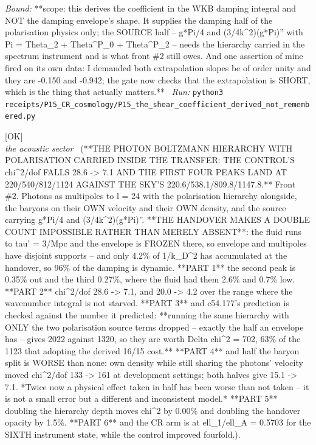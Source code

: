 \begin{description}
 \emph{Bound:} **scope: this derives the coefficient in the WKB damping integral and NOT the damping envelope's shape. It supplies the damping half of the polarisation physics only; the SOURCE half -- g*Pi/4 and (3/4k\textasciicircum{}2)(g*Pi)'' with Pi = Theta\_2 + Theta\textasciicircum{}P\_0 + Theta\textasciicircum{}P\_2 -- needs the hierarchy carried in the spectrum instrument and is what front \#2 still owes. And one assertion of mine fired on its own data: I demanded both extrapolation slopes be of order unity and they are -0.150 and -0.942; the gate now checks that the extrapolation is SHORT, which is the thing that actually matters.**
\ \emph{Run:} \texttt{python3 receipts/P15\_CR\_cosmology/P15\_the\_shear\_coefficient\_derived\_not\_remembered.py}
\item[\label{rcpt:P15_the_photon_hierarchy_in_the_transfer}\texttt{P15\_the\_photon\_hierarchy\_in\_the\_transfer}]\hfill\textsf{[OK]}\\
\textit{the acoustic sector} \ (**THE PHOTON BOLTZMANN HIERARCHY WITH POLARISATION CARRIED INSIDE THE TRANSFER: THE CONTROL'S chi\textasciicircum{}2/dof FALLS 28.6 -> 7.1 AND THE FIRST FOUR PEAKS LAND AT 220/540/812/1124 AGAINST THE SKY'S 220.6/538.1/809.8/1147.8.** Front \#2. Photons as multipoles to l = 24 with the polarisation hierarchy alongside, the baryons on their OWN velocity and their OWN density, and the source carrying g*Pi/4 and (3/4k\textasciicircum{}2)(g*Pi)''. **THE HANDOVER MAKES A DOUBLE COUNT IMPOSSIBLE RATHER THAN MERELY ABSENT**: the fluid runs to tau' = 3/Mpc and the envelope is FROZEN there, so envelope and multipoles have disjoint supports -- and only 4.2\% of 1/k\_D\textasciicircum{}2 has accumulated at the handover, so 96\% of the damping is dynamic. **PART 1** the second peak is 0.35\% out and the third 0.27\%, where the fluid had them 2.6\% and 0.7\% low. **PART 2** chi\textasciicircum{}2/dof 28.6 -> 7.1, and 20.0 -> 4.2 over the range where the wavenumber integral is not starved. **PART 3** and c54.177's prediction is checked against the number it predicted: **running the same hierarchy with ONLY the two polarisation source terms dropped -- exactly the half an envelope has -- gives 2022 against 1320, so they are worth Delta chi\textasciicircum{}2 = 702, 63\% of the 1123 that adopting the derived 16/15 cost.** **PART 4** and half the baryon split is WORSE than none: own density while still sharing the photons' velocity moved chi\textasciicircum{}2/dof 133 -> 161 at development settings; both halves give 15.1 -> 7.1. *Twice now a physical effect taken in half has been worse than not taken -- it is not a small error but a different and inconsistent model.* **PART 5** doubling the hierarchy depth moves chi\textasciicircum{}2 by 0.00\% and doubling the handover opacity by 1.5\%. **PART 6** and the CR arm is at ell\_1/ell\_A = 0.5703 for the SIXTH instrument state, while the control improved fourfold.). 

\end{description}
